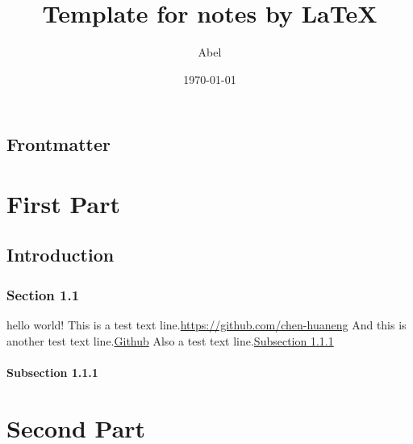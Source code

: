 \documentclass{note}
\begin{document}
\title{Template for notes by \LaTeX}
\author{Abel}
\date{\today}

%

{
    \hypersetup{linkcolor=red!75!black} %
    \tableofcontents
}

\frontmatter

% 

\chapter{Frontmatter}
\lipsum[5-10]

\mainmatter

% 
% 
% 
% 
% 
% 

\part{First Part}

\chapter{Introduction}

\section{Section 1.1}

hello world!\cite{2015The} This is a test text line.\url{https://github.com/chen-huaneng} And this is another test text line.\href{https://github.com/chen-huaneng}{Github} Also a test text line.\hyperref[test]{Subsection 1.1.1}

\lipsum[5-10]

\subsection{Subsection 1.1.1}\label{test}

\lipsum[5-10]

\part{Second Part}
\end{document}
